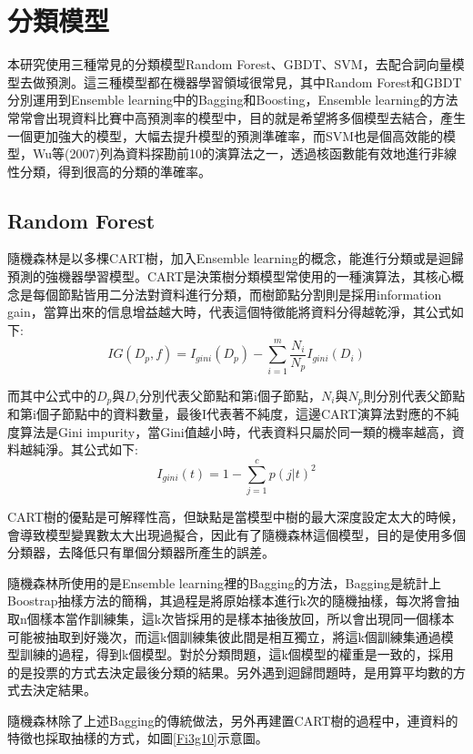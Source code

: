 \newpage

\section{分類模型}

	本研究使用三種常見的分類模型Random Forest、GBDT、SVM，去配合詞向量模型去做預測。這三種模型都在機器學習領域很常見，其中Random Forest和GBDT分別運用到Ensemble learning中的Bagging和Boosting，Ensemble learning的方法常常會出現資料比賽中高預測率的模型中，目的就是希望將多個模型去結合，產生一個更加強大的模型，大幅去提升模型的預測準確率，而SVM也是個高效能的模型，Wu等(2007)列為資料探勘前10的演算法之一，透過核函數能有效地進行非線性分類，得到很高的分類的準確率。
	
\subsection{Random Forest}

	隨機森林是以多棵CART樹，加入Ensemble learning的概念，能進行分類或是迴歸預測的強機器學習模型。CART是決策樹分類模型常使用的一種演算法，其核心概念是每個節點皆用二分法對資料進行分類，而樹節點分割則是採用information gain，當算出來的信息增益越大時，代表這個特徵能將資料分得越乾淨，其公式如下:
	$$IG(D_p,f) = I_{gini}(D_p)-\sum_{i=1}^{m} \dfrac{N_i}{N_p}I_{gini}(D_i)$$
	
\noindent 而其中公式中的$D_p$與$D_i$分別代表父節點和第i個子節點，$N_i$與$N_p$則分別代表父節點和第i個子節點中的資料數量，最後I代表著不純度，這邊CART演算法對應的不純度算法是Gini impurity，當Gini值越小時，代表資料只屬於同一類的機率越高，資料越純淨。其公式如下:
	$$I_{gini}(t) = 1-\sum_{j=1}^{c}p(j|t)^2$$

\noindent CART樹的優點是可解釋性高，但缺點是當模型中樹的最大深度設定太大的時候，會導致模型變異數太大出現過擬合，因此有了隨機森林這個模型，目的是使用多個分類器，去降低只有單個分類器所產生的誤差。
	
	隨機森林所使用的是Ensemble learning裡的Bagging的方法，Bagging是統計上Boostrap抽樣方法的簡稱，其過程是將原始樣本進行k次的隨機抽樣，每次將會抽取n個樣本當作訓練集，這k次皆採用的是樣本抽後放回，所以會出現同一個樣本可能被抽取到好幾次，而這k個訓練集彼此間是相互獨立，將這k個訓練集通過模型訓練的過程，得到k個模型。對於分類問題，這k個模型的權重是一致的，採用的是投票的方式去決定最後分類的結果。另外遇到迴歸問題時，是用算平均數的方式去決定結果。
	
	隨機森林除了上述Bagging的傳統做法，另外再建置CART樹的過程中，連資料的特徵也採取抽樣的方式，如圖\ref{Fi3g10}示意圖。\\
	
